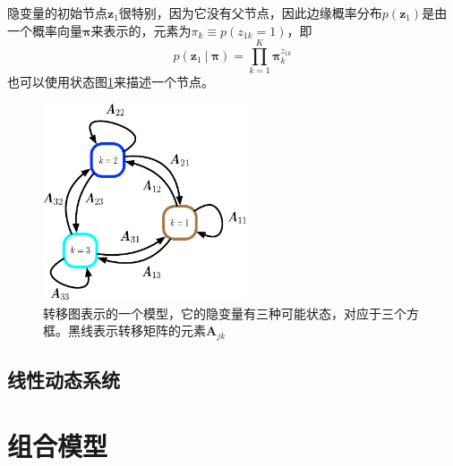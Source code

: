 \documentclass[11pt]{ctexbook}
\begin{document}
隐变量的初始节点$\bm z_1$很特别，因为它没有父节点，因此边缘概率分布$p(\bm z_1)$是由一个概率向量$\bm\pi$来表示的，元素为$\pi_k \equiv p(z_{1k}=1)$，即
\begin{equation}
	p(\bm z_1\ |\ \bm\pi) = \prod_{k=1}^K\bm\pi_k^{z_{1k}}
\end{equation}
也可以使用状态图\ref{fig:hmm-state}来描述一个节点。
\begin{figure}
	\centering
	\includegraphics[width=6cm]{HMM-State}
	\caption{转移图表示的一个模型，它的隐变量有三种可能状态，对应于三个方框。黑线表示转移矩阵的元素$\bm A_{jk}$}
	\label{fig:hmm-state}
\end{figure}
\section{线性动态系统}


\chapter{组合模型}
\end{document}
